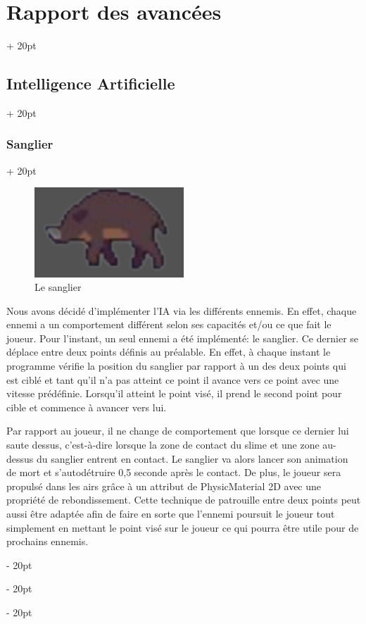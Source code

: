 \documentclass[a4paper, 12pt, twoside]{article}
\newcommand{\ind}[1][20pt]{\advance\leftskip + #1}
\newcommand{\deind}[1][20pt]{\advance\leftskip - #1}
\newenvironment{indt}[2][20pt]{#2 \par \ind[#1]}{\par \deind} %
\begin{document}
\begin{indt}{\section{Rapport des avancées}}
        \begin{indt}{\subsection{Intelligence Artificielle}}
            \begin{indt}{\subsubsection{Sanglier}}
                \begin{figure}[h]
                    \centering
                    \includegraphics[width=0.5\textwidth]{sanglier.png}
                    \caption{Le sanglier}
                    \label{fig:mesh1}
                \end{figure}

                Nous avons décidé d’implémenter l’IA via les différents ennemis. En effet, chaque ennemi a un comportement différent selon ses capacités et/ou ce que fait le joueur. Pour l’instant, un seul ennemi a été implémenté: le sanglier. Ce dernier se déplace entre deux points définis au préalable. En effet, à chaque instant le programme vérifie la position du sanglier par rapport à un des deux points qui est ciblé et tant qu’il n’a pas atteint ce point  il avance vers ce point avec une vitesse prédéfinie. Lorsqu’il atteint le point visé, il prend le second point pour cible et commence à avancer vers lui.

                Par rapport au joueur, il ne change de comportement que lorsque ce dernier lui saute dessus, c'est-à-dire lorsque la zone de contact du slime et une zone au-dessus du sanglier entrent en contact. Le sanglier va alors lancer son animation de mort et s’autodétruire 0,5 seconde après le contact. De plus, le joueur sera propulsé dans les airs grâce à un attribut de PhysicMaterial 2D avec une propriété de rebondissement. Cette technique de patrouille entre deux points  peut aussi être adaptée afin de faire en sorte que l’ennemi poursuit le joueur tout simplement en mettant le point visé sur le joueur ce qui pourra être utile pour de prochains ennemis.


\end{indt}
\end{indt}
\end{indt}
\end{document}
